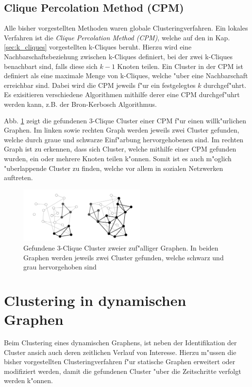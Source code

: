 \documentclass[journal]{vgtc}
\begin{document}
  \subsection{Clique Percolation Method (CPM)}
    \label{sec:CPM}
    Alle bisher vorgestellten Methoden waren globale Clusteringverfahren. Ein lokales Verfahren ist die
    \emph{Clique Percolation Method (CPM)}\cite{CPM}, welche auf den in Kap. \ref{sec:k_cliques}
    vorgestellten k-Cliques beruht. Hierzu wird eine Nachbarschaftsbeziehung zwischen k-Cliques definiert, 
    bei der zwei k-Cliques benachbart sind, falls diese sich $k-1$ Knoten teilen. 
    Ein Cluster in der CPM ist definiert als eine maximale Menge von k-Cliques, welche "uber eine Nachbarschaft
    erreichbar sind. Dabei wird die CPM jeweils f"ur ein festgelegtes $k$ durchgef"uhrt. Es exisitieren 
    verschiedene Algorithmen mithilfe derer eine CPM durchgef"uhrt werden kann, z.B. der Bron-Kerbosch Algorithmus.
    
    Abb. \ref{fig:CPM} zeigt die gefundenen 3-Clique Cluster einer CPM f"ur einen willk"urlichen Graphen.
    Im linken sowie rechten Graph werden jeweils zwei Cluster gefunden, welche durch graue und schwarze
    Einf"arbung hervorgehobenen sind. Im rechten Graph ist zu erkennen, dass sich Cluster, welche mithilfe einer
    CPM gefunden wurden, ein oder mehrere Knoten teilen k"onnen. Somit ist es auch m"oglich "uberlappende Cluster
    zu finden, welche vor allem in sozialen Netzwerken auftreten.
    \begin{figure}[h]
     \centering
     \includegraphics[width=2.5in]{images/k-cliques}
     \caption{\label{fig:CPM} Gefundene 3-Clique Cluster zweier zuf"alliger Graphen. In beiden Graphen werden jeweils zwei
		Cluster gefunden, welche schwarz und grau hervorgehoben sind \cite{CPM}}
    \end{figure}


\section{Clustering in dynamischen Graphen}
  \label{sec:dynamic_clustering}
  Beim Clustering eines dynamischen Graphens, ist neben der Identifikation der Cluster ansich auch deren
  zeitlichen Verlauf von Interesse. Hierzu m"ussen die bisher vorgestellten Clusteringverfahren f"ur statische
  Graphen erweitert oder modifiziert werden, damit die gefundenen Cluster "uber die Zeitschritte verfolgt werden
  k"onnen.
  
\end{document}
